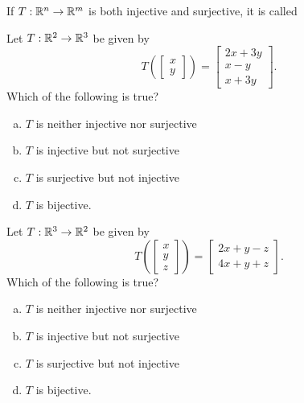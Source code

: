 \begin{applicationActivities}{3}{19}
\begin{activity}{15}
\end{activity}

\begin{definition}
If $T: \mathbb{R}^n \rightarrow \mathbb{R}^m$ is both injective and surjective, it is called 
\end{definition}

\begin{activity}{10}
Let $T: \mathbb{R}^2 \rightarrow \mathbb{R}^3$ be given by $$T\left(\begin{bmatrix} x \\ y \end{bmatrix} \right) = \begin{bmatrix} 2x+3y \\ x-y \\ x+3y\end{bmatrix}.$$  Which of the following is true?
\begin{enumerate}[(a)]
\item $T$ is neither injective nor surjective
\item $T$ is injective but not surjective
\item $T$ is surjective but not injective
\item $T$ is bijective.
\end{enumerate}
\end{activity}

\begin{activity}{5}
Let $T: \mathbb{R}^3 \rightarrow \mathbb{R}^2$ be given by $$T\left(\begin{bmatrix} x \\ y  \\ z \end{bmatrix} \right) = \begin{bmatrix} 2x+y-z \\ 4x+y+z\end{bmatrix}.$$  Which of the following is true?
\begin{enumerate}[(a)]
\item $T$ is neither injective nor surjective
\item $T$ is injective but not surjective
\item $T$ is surjective but not injective
\item $T$ is bijective.
\end{enumerate}
\end{activity}


\end{applicationActivities}

